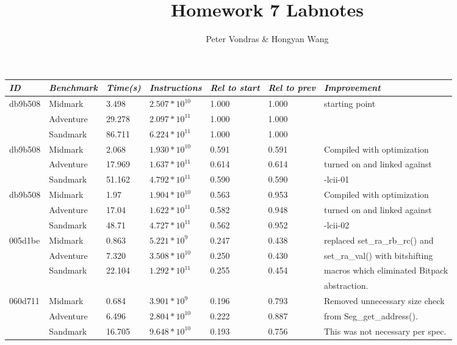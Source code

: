 \documentclass[fleqn]{article}
\title{\vspace{-5ex} Homework 7 Labnotes}
\author{Peter Vondras \& Hongyan Wang}
\date{\vspace{-6ex}}
\begin{document}
\maketitle
\hspace{0mm}

\begin{center}
    \begin{tabular}{ l  l  l  l l l l }
    \hline
    \textit{ID} & \textit{Benchmark} & \textit{Time(s)} & \textit{Instructions} & \textit{Rel to start} & \textit{Rel to prev} & \textit{Improvement} \\ \hline
    db9b508 & Midmark   & 3.498  & $2.507*10^{10}$ & 1.000 & 1.000 & starting point \\ 
       & Adventure & 29.278 & $2.097*10^{11}$ & 1.000 & 1.000 & \\
       & Sandmark  & 86.711 & $6.224*10^{11}$ & 1.000 & 1.000 & \\ \hline 
    db9b508 & Midmark   & 2.068  & $1.930*10^{10}$ & 0.591 & 0.591 & Compiled with optimization \\ 
       & Adventure & 17.969 & $1.637*10^{11}$ & 0.614 & 0.614 & turned on and linked against\\
       & Sandmark  & 51.162 & $4.792*10^{11}$ & 0.590 & 0.590 & -lcii-01 \\ \hline 
    db9b508 & Midmark   & 1.97   & $1.904*10^{10}$ & 0.563 & 0.953 & Compiled with optimization \\ 
       & Adventure & 17.04  & $1.622*10^{11}$ & 0.582 & 0.948 & turned on and linked against \\
       & Sandmark  & 48.71  & $4.727*10^{11}$ & 0.562 & 0.952 & -lcii-02 \\ \hline 
    005d1be & Midmark   & 0.863  & $5.221*10^{9}$ & 0.247 & 0.438 & replaced set\_ra\_rb\_rc() and \\ 
       & Adventure & 7.320 & $3.508*10^{10}$ & 0.250 & 0.430 & set\_ra\_val() with bitshifting \\
       & Sandmark  & 22.104 & $1.292*10^{11}$ & 0.255 & 0.454 & macros which eliminated Bitpack\\ 
       &   &  &  &  &  & abstraction. \\ \hline 
   	060d711 & Midmark   & 0.684 & $3.901*10^{9}$ & 0.196 & 0.793 & Removed unnecessary size check \\ 
       & Adventure & 6.496 & $2.804*10^{10}$ & 0.222 & 0.887 & from Seg\_get\_address(). \\
       & Sandmark  & 16.705 & $9.648*10^{10}$ & 0.193 & 0.756 & This was not necessary per spec. \\ \hline 

\end{tabular}
\end{center}
\end{document}
